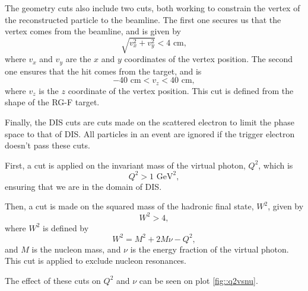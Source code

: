     The geometry cuts also include two cuts, both working to constrain the vertex of the reconstructed particle to the beamline.
    The first one secures us that the vertex comes from the beamline, and is given by
    \begin{equation*}
        \sqrt{v_x^2 + v_y^2} < 4 \text{ cm},
    \end{equation*}
    where $v_x$ and $v_y$ are the $x$ and $y$ coordinates of the vertex position.
    The second one ensures that the hit comes from the target, and is
    \begin{equation*}
        -40 \text{ cm} < v_z < 40 \text{ cm},
    \end{equation*}
    where $v_z$ is the $z$ coordinate of the vertex position.
    This cut is defined from the shape of the RG-F target.

    Finally, the DIS cuts are cuts made on the scattered electron to limit the phase space to that of DIS.
    All particles in an event are ignored if the trigger electron doesn't pass these cuts.

    First, a cut is applied on the invariant mass of the virtual photon, $Q^2$, which is
    \begin{equation*}
        Q^2 > 1 \text{ GeV}^2,
    \end{equation*}
    ensuring that we are in the domain of DIS.

    Then, a cut is made on the squared mass of the hadronic final state, $W^2$, given by
    \begin{equation*}
        W^2 > 4,
    \end{equation*}
    where $W^2$ is defined by
    \begin{equation*}
        W^2 = M^2 + 2M\nu - Q^2,
    \end{equation*}
    and $M$ is the nucleon mass, and $\nu$ is the energy fraction of the virtual photon.
    This cut is applied to exclude nucleon resonances.

    The effect of these cuts on $Q^2$ and $\nu$ can be seen on plot \ref{fig::q2vsnu}.
